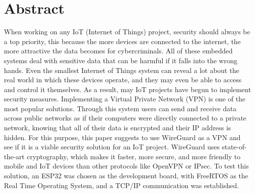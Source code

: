 \chapter*{Abstract}
When working on any IoT (Internet of Things) project, security should always be a top priority, this because the more devices are connected to the internet, the more attractive the data becomes for cybercriminals.
All of these embedded systems deal with sensitive data that can be harmful if it falls into the wrong hands. Even the smallest Internet of Things system can reveal a lot about the real world in which these devices operate, and they may even be able to access and control it themselves.
As a result, may IoT projects have begun to implement security measures. Implementing a Virtual Private Network (VPN) is one of the most popular solutions.
Through this system users can send and receive data across public networks as if their computers were directly connected to a private network, knowing that all of their data is encrypted and their IP address is hidden.
For this purpose, this paper suggests to use WireGuard as a VPN and see if it is a viable security solution for an IoT project. 
WireGuard uses state-of-the-art cryptography, which makes it faster, more secure, and more friendly to mobile and IoT devices than other protocols like OpenVPN or IPsec.
To test this solution, an ESP32 was chosen as the development board, with FreeRTOS as the Real Time Operating System, and a TCP/IP communication was established.